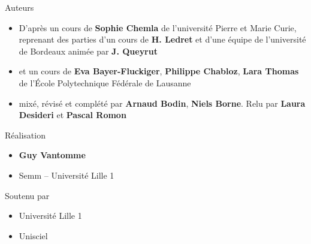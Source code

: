 \begin{frame}
\begin{minipage}{0.90\textwidth}
   \smallskip
   
  Auteurs
  \begin{itemize}
    \item D'après un cours de {\bf Sophie Chemla} de l'université Pierre et Marie Curie,  
  reprenant des parties d'un cours de {\bf H. Ledret} et d'une équipe de l'université de 
  Bordeaux animée par {\bf J. Queyrut}
  
  \item et un cours de {\bf Eva Bayer-Fluckiger}, {\bf Philippe Chabloz}, {\bf Lara Thomas}
  de l'\'Ecole Polytechnique Fédérale de Lausanne
 
  \item mixé, révisé et complété par {\bf Arnaud Bodin}, {\bf Niels Borne}. Relu par {\bf Laura Desideri} et {\bf Pascal Romon}
  
  
  \end{itemize}

  \smallskip

  Réalisation
  \begin{itemize}
    \item {\bf Guy Vantomme}
    \item Semm -- Université Lille 1
  \end{itemize}

  \smallskip

  Soutenu par 
  \begin{itemize}
    \item Université Lille 1
    \item Unisciel
  \end{itemize}

  \end{minipage}  



\end{frame}


